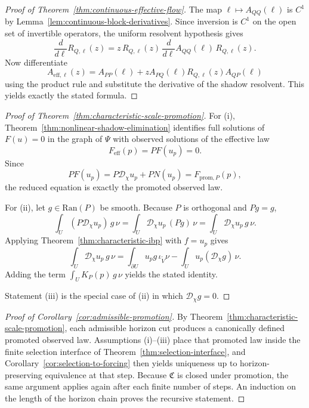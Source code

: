 \begin{proof}[Proof of Theorem~\ref{thm:continuous-effective-flow}]
\label{proof:thm:continuous-effective-flow}
The map $\ell\mapsto A_{QQ}(\ell)$ is $C^1$ by
Lemma~\ref{lem:continuous-block-derivatives}. Since inversion is $C^1$ on the
open set of invertible operators, the uniform resolvent hypothesis gives
\[
\frac{d}{d\ell}R_{Q,\ell}(z)
=
z\,R_{Q,\ell}(z)\,\frac{d}{d\ell}A_{QQ}(\ell)\,R_{Q,\ell}(z).
\]
Now differentiate
\[
A_{\mathrm{eff},\ell}(z)
=
A_{PP}(\ell)+zA_{PQ}(\ell)R_{Q,\ell}(z)A_{QP}(\ell)
\]
using the product rule and substitute the derivative of the shadow resolvent.
This yields exactly the stated formula.
\end{proof}

\begin{proof}[Proof of Theorem~\ref{thm:characteristic-scale-promotion}]
\label{proof:thm:characteristic-scale-promotion}
For (i), Theorem~\ref{thm:nonlinear-shadow-elimination} identifies full
solutions of $F(u)=0$ in the graph of $\Psi$ with observed solutions of the
effective law
\[
F_{\mathrm{eff}}(p)=PF(u_p)=0.
\]
Since
\[
PF(u_p)=P\mathcal D_\chi u_p + PN(u_p)=F_{\mathrm{prom},P}(p),
\]
the reduced equation is exactly the promoted observed law.

For (ii), let $g\in \mathrm{Ran}(P)$ be smooth. Because $P$ is orthogonal and
$Pg=g$,
\[
\int_U (P\mathcal D_\chi u_p)\,g\,\nu
=
\int_U \mathcal D_\chi u_p\,(Pg)\,\nu
=
\int_U \mathcal D_\chi u_p\,g\,\nu.
\]
Applying Theorem~\ref{thm:characteristic-ibp} with $f=u_p$ gives
\[
\int_U \mathcal D_\chi u_p\,g\,\nu
=
\int_{\partial U}u_p g\,\iota_{\widetilde V}\nu
-
\int_U u_p(\mathcal D_\chi g)\,\nu.
\]
Adding the term $\int_U K_P(p)\,g\,\nu$ yields the stated identity.

Statement (iii) is the special case of (ii) in which $\mathcal D_\chi g=0$.
\end{proof}

\begin{proof}[Proof of Corollary~\ref{cor:admissible-promotion}]
\label{proof:cor:admissible-promotion}
By Theorem~\ref{thm:characteristic-scale-promotion}, each admissible horizon
cut produces a canonically defined promoted observed law. Assumptions (i)--(iii)
place that promoted law inside the finite selection interface of
Theorem~\ref{thm:selection-interface}, and
Corollary~\ref{cor:selection-to-forcing} then yields uniqueness up to
horizon-preserving equivalence at that step. Because $\mathfrak C$ is closed
under promotion, the same argument applies again after each finite number of
steps. An induction on the length of the horizon chain proves the recursive
statement.
\end{proof}


